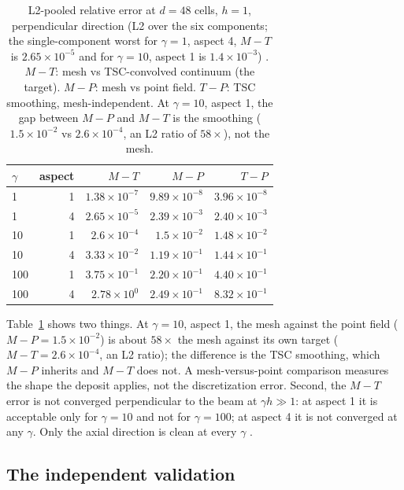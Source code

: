 \begin{table}[t]
\centering
\small
\caption{L2-pooled relative error at $d=48$ cells, $h=1$, perpendicular
direction (L2 over the six components; the single-component worst for
$\gamma=1$, aspect 4, $M\!-\!T$ is $2.65\times10^{-5}$ and for
$\gamma=10$, aspect 1 is $1.4\times10^{-3}$) \citep{N2b}.
$M\!-\!T$: mesh vs TSC-convolved continuum (the target). $M\!-\!P$: mesh vs
point field. $T\!-\!P$: TSC smoothing, mesh-independent. At $\gamma=10$,
aspect 1, the gap between $M\!-\!P$ and $M\!-\!T$ is the smoothing
($1.5\times10^{-2}$ vs $2.6\times10^{-4}$, an L2 ratio of $58\times$), not
the mesh.}
\label{tab:d48}
\begin{tabular}{lrrrr}
\toprule
$\gamma$ & aspect & $M\!-\!T$ & $M\!-\!P$ & $T\!-\!P$ \\
\midrule
1   & 1 & $1.38\times10^{-7}$ & $9.89\times10^{-8}$ & $3.96\times10^{-8}$ \\
1   & 4 & $2.65\times10^{-5}$  & $2.39\times10^{-3}$  & $2.40\times10^{-3}$  \\
10  & 1 & $2.6\times10^{-4}$    & $1.5\times10^{-2}$   & $1.48\times10^{-2}$  \\
10  & 4 & $3.33\times10^{-2}$  & $1.19\times10^{-1}$  & $1.44\times10^{-1}$  \\
100 & 1 & $3.75\times10^{-1}$  & $2.20\times10^{-1}$  & $4.40\times10^{-1}$  \\
100 & 4 & $2.78\times10^{0}$   & $2.49\times10^{-1}$  & $8.32\times10^{-1}$  \\
\bottomrule
\end{tabular}
\end{table}

Table~\ref{tab:d48} shows two things. At $\gamma=10$, aspect 1, the mesh
against the point field ($M\!-\!P=1.5\times10^{-2}$) is about $58\times$ the
mesh against its own target ($M\!-\!T=2.6\times10^{-4}$, an L2 ratio); the
difference is
the TSC smoothing, which $M\!-\!P$ inherits and $M\!-\!T$ does not. A
mesh-versus-point comparison measures the shape the deposit applies, not the
discretization error. Second, the $M\!-\!T$ error is not converged
perpendicular to the beam at $\gamma h \gg 1$: at aspect 1 it is acceptable
only for $\gamma=10$ and not for $\gamma=100$; at aspect 4 it is not
converged at any $\gamma$. Only the axial direction is clean at every
$\gamma$ \citep{N2b}.

\subsection{The independent validation}

